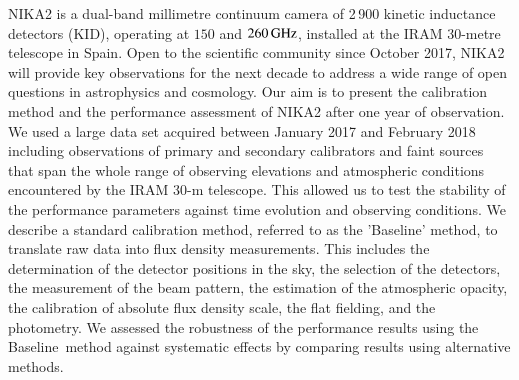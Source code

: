 \documentclass[traditionalabstract]{aa}
\newcommand{\baseline}{Baseline}%
\newcommand{\lp}[1]{#1}
\newcommand{\LEt}[1]{{\bf {\color[RGB]{0, 153, 255} #1}}}
\begin{document}
       {
         NIKA2 is a dual-band millimetre continuum
         camera of 2\,900 kinetic inductance detectors (KID),
         operating at $150$ and $260\,\rm{GHz}$, installed at the IRAM 30-metre
         telescope %
          in Spain.
         Open to the scientific community since October 2017, NIKA2 
         will provide key observations for the next decade to 
         address a wide range of open questions in astrophysics and
         cosmology.}
       {Our aim is to present {\lp the calibration method} and the performance assessment of NIKA2 after one year of observation.}
       {We used %
       a large data set acquired between January 2017 and
         February 2018 including observations of primary and secondary
         calibrators and faint sources that span the whole range
         of observing elevations and atmospheric conditions encountered by the
         IRAM 30-m telescope. This allowed us to test the stability of the
         performance parameters against time evolution and
         observing conditions. {\lp We describe a standard calibration
         method, referred to as the '\baseline' method, to translate
         raw data into flux density measurements. This includes the
         determination of the detector positions in the sky, the
         selection of the detectors, the measurement of
         the beam pattern, the estimation of the 
         atmospheric opacity, the calibration of absolute flux density
         scale, the flat fielding, and the photometry. We
         assessed the robustness of the performance results using the
         \baseline\ method against systematic effects by
         comparing results using alternative methods.}  
       }
\end{document}
